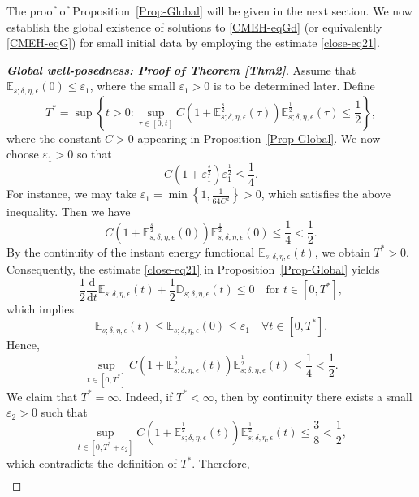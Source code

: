 \documentclass[reqno,11pt]{amsart}
\numberwithin{equation}{section}
\def\d{\mathrm{d}}
\begin{document}
The proof of Proposition~\ref{Prop-Global} will be given in the next section. We now establish the global existence of solutions to \eqref{CMEH-eqGd} (or equivalently \eqref{CMEH-eqG}) for small initial data by employing the estimate \eqref{close-eq21}.


\begin{proof}[{\bf Global well-posedness: Proof of Theorem \ref{Thm2}}]

    Assume that \( \mathbb{E}_{s;\delta, \eta, \epsilon} (0) \leq \varepsilon_{1} \), where the small \( \varepsilon_{1} > 0 \) is to be determined later. Define
\[
T^{*} = \sup \left\{ t > 0 : \sup_{\tau \in [0,t]} C \left( 1 + \mathbb{E}_{s;\delta, \eta, \epsilon}^{\frac{s}{2}}(\tau) \right) \mathbb{E}_{s;\delta, \eta, \epsilon}^{\frac{1}{2}}(\tau) \leq \frac{1}{2} \right\},
\]
where the constant \( C > 0 \) appearing in Proposition~\ref{Prop-Global}. We now choose \( \varepsilon_{1} > 0 \) so that
\[
C \left( 1 + \varepsilon_{1}^{\frac{s}{2}} \right) \varepsilon_{1}^{\frac{1}{2}} \leq \frac{1}{4}.
\]
For instance, we may take \( \varepsilon_{1} = \min \left\{ 1, \frac{1}{64 C^{2}} \right\} > 0 \), which satisfies the above inequality. Then we have
\[
C \left( 1 + \mathbb{E}_{s;\delta, \eta, \epsilon}^{\frac{s}{2}}(0) \right) \mathbb{E}_{s;\delta, \eta, \epsilon}^{\frac{1}{2}}(0) \leq \frac{1}{4} < \frac{1}{2}.
\]
By the continuity of the instant energy functional $\mathbb{E}_{s;\delta,\eta,\epsilon}(t)$, we obtain $T^{*} > 0$. Consequently, the estimate \eqref{close-eq21} in Proposition~\ref{Prop-Global} yields
\[
\frac{1}{2} \frac{\d}{\d t} \mathbb{E}_{s;\delta, \eta, \epsilon} (t) + \frac{1}{2} \mathbb{D}_{s;\delta, \eta, \epsilon}(t) \leq 0 \quad \text{for } t \in [0, T^{*}],
\]
which implies
\[
\mathbb{E}_{s;\delta, \eta, \epsilon} (t) \leq \mathbb{E}_{s;\delta, \eta, \epsilon} (0) \leq \varepsilon_{1} \quad \forall t \in [0, T^{*}].
\]
Hence,
\[
\sup_{t \in [0,T^{*}]} C \left( 1 + \mathbb{E}_{s;\delta, \eta, \epsilon}^{\frac{s}{2}}(t) \right) \mathbb{E}_{s;\delta, \eta, \epsilon}^{\frac{1}{2}}(t) \leq \frac{1}{4} < \frac{1}{2}.
\]
We claim that \( T^{*} = \infty \). Indeed, if $T^{*} < \infty$, then by continuity there exists a small $\varepsilon_2 > 0$ such that
\[
\sup_{t \in [0, T^{*} + \varepsilon_{2}]} C \left( 1 + \mathbb{E}_{s;\delta, \eta, \epsilon}^{\frac{1}{2}}(t) \right) \mathbb{E}_{s;\delta, \eta, \epsilon}^{\frac{1}{2}}(t) \leq \frac{3}{8} < \frac{1}{2},
\]
which contradicts the definition of \( T^{*} \). Therefore,
\begin{equation}\label{GL-1}
    \begin{aligned}

\end{aligned}
\end{equation}
\end{proof}
\end{document}
